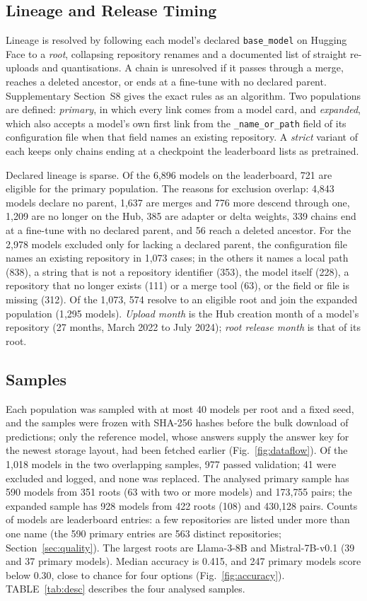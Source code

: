 \documentclass{ieeeaccess}
\theoremstyle{definition}
\theoremstyle{plain}
\begin{document}
\subsection{Lineage and Release Timing}
\label{sec:lineage}
Lineage is resolved by following each model's declared \texttt{base\_model} on Hugging Face to a \emph{root}, collapsing repository renames and a documented list of straight re-uploads and quantisations. A chain is unresolved if it passes through a merge, reaches a deleted ancestor, or ends at a fine-tune with no declared parent. Supplementary Section~S8 gives the exact rules as an algorithm. Two populations are defined: \emph{primary}, in which every link comes from a model card, and \emph{expanded}, which also accepts a model's own first link from the \texttt{\_name\_or\_path} field of its configuration file when that field names an existing repository. A \emph{strict} variant of each keeps only chains ending at a checkpoint the leaderboard lists as pretrained.


Declared lineage is sparse. Of the 6{,}896 models on the leaderboard, 721 are eligible for the primary population. The reasons for exclusion overlap: 4{,}843 models declare no parent, 1{,}637 are merges and 776 more descend through one, 1{,}209 are no longer on the Hub, 385 are adapter or delta weights, 339 chains end at a fine-tune with no declared parent, and 56 reach a deleted ancestor. For the 2{,}978 models excluded only for lacking a declared parent, the configuration file names an existing repository in 1{,}073 cases; in the others it names a local path (838), a string that is not a repository identifier (353), the model itself (228), a repository that no longer exists (111) or a merge tool (63), or the field or file is missing (312). Of the 1{,}073, 574 resolve to an eligible root and join the expanded population (1{,}295 models). \emph{Upload month} is the Hub creation month of a model's repository (27 months, March 2022 to July 2024); \emph{root release month} is that of its root.

\subsection{Samples}
Each population was sampled with at most 40 models per root and a fixed seed, and the samples were frozen with SHA-256 hashes before the bulk download of predictions; only the reference model, whose answers supply the answer key for the newest storage layout, had been fetched earlier (Fig.~\ref{fig:dataflow}). Of the 1{,}018 models in the two overlapping samples, 977 passed validation; 41 were excluded and logged, and none was replaced. The analysed primary sample has 590 models from 351 roots (63 with two or more models) and 173{,}755 pairs; the expanded sample has 928 models from 422 roots (108) and 430{,}128 pairs. Counts of models are leaderboard entries: a few repositories are listed under more than one name (the 590 primary entries are 563 distinct repositories; Section~\ref{sec:quality}). The largest roots are Llama-3-8B and Mistral-7B-v0.1 (39 and 37 primary models). Median accuracy is 0.415, and 247 primary models score below 0.30, close to chance for four options (Fig.~\ref{fig:accuracy}). TABLE~\ref{tab:desc} describes the four analysed samples.
\end{document}
